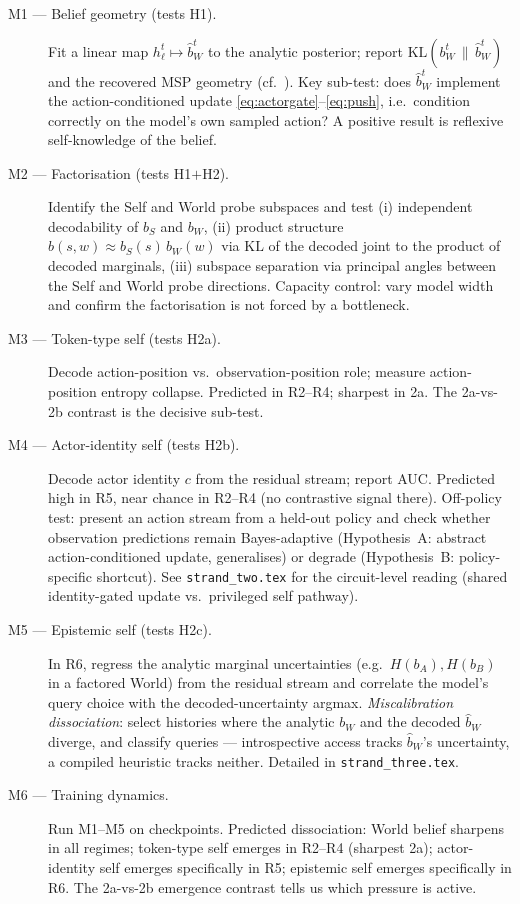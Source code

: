 \documentclass[11pt]{article}
\begin{document}
\begin{description}
  \item[M1 --- Belief geometry (tests H1).] Fit a linear map $h_\ell^t\mapsto
  \hat b_W^t$ to the analytic posterior; report $\mathrm{KL}(b_W^t\,\|\,\hat
  b_W^t)$ and the recovered MSP geometry (cf.\ \citep{shai2024belief}). Key
  sub-test: does $\hat b_W^t$ implement the action-conditioned update
  \eqref{eq:actorgate}--\eqref{eq:push}, i.e.\ condition correctly on the
  model's own sampled action? A positive result is reflexive self-knowledge of
  the belief.

  \item[M2 --- Factorisation (tests H1$+$H2).] Identify the Self and World probe
  subspaces and test (i) independent decodability of $b_S$ and $b_W$,
  (ii) product structure $b(s,w)\approx b_S(s)\,b_W(w)$ via $\mathrm{KL}$ of the
  decoded joint to the product of decoded marginals, (iii) subspace separation
  via principal angles between the Self and World probe directions. Capacity
  control: vary model width and confirm the factorisation is not forced by a
  bottleneck.

  \item[M3 --- Token-type self (tests H2a).] Decode action-position vs.\
  observation-position role; measure action-position entropy collapse. Predicted
  in R2--R4; sharpest in 2a. The 2a-vs-2b contrast is the decisive sub-test.

  \item[M4 --- Actor-identity self (tests H2b).] Decode actor identity $c$ from
  the residual stream; report AUC. Predicted high in R5, near chance in R2--R4
  (no contrastive signal there). Off-policy test: present an action stream from
  a held-out policy and check whether observation predictions remain
  Bayes-adaptive (Hypothesis~A: abstract action-conditioned update, generalises)
  or degrade (Hypothesis~B: policy-specific shortcut). See
  \texttt{strand\_two.tex} for the circuit-level reading (shared identity-gated
  update vs.\ privileged self pathway).

  \item[M5 --- Epistemic self (tests H2c).] In R6, regress the analytic marginal
  uncertainties (e.g.\ $H(b_A),H(b_B)$ in a factored World) from the residual
  stream and correlate the model's query choice with the decoded-uncertainty
  argmax. \emph{Miscalibration dissociation}: select histories where the
  analytic $b_W$ and the decoded $\hat b_W$ diverge, and classify queries ---
  introspective access tracks $\hat b_W$'s uncertainty, a compiled heuristic
  tracks neither. Detailed in \texttt{strand\_three.tex}.

  \item[M6 --- Training dynamics.] Run M1--M5 on checkpoints. Predicted
  dissociation: World belief sharpens in all regimes; token-type self emerges in
  R2--R4 (sharpest 2a); actor-identity self emerges specifically in R5;
  epistemic self emerges specifically in R6. The 2a-vs-2b emergence contrast
  tells us which pressure is active.
\end{description}
\end{document}
